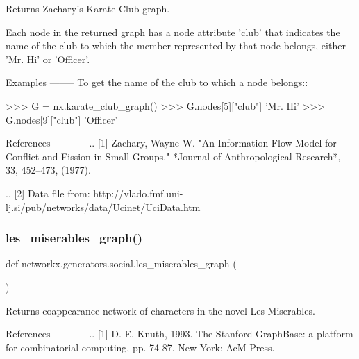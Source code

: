 \begin{DoxyVerb}Returns Zachary's Karate Club graph.

Each node in the returned graph has a node attribute 'club' that
indicates the name of the club to which the member represented by that node
belongs, either 'Mr. Hi' or 'Officer'.

Examples
--------
To get the name of the club to which a node belongs::

    >>> G = nx.karate_club_graph()
    >>> G.nodes[5]["club"]
    'Mr. Hi'
    >>> G.nodes[9]["club"]
    'Officer'

References
----------
.. [1] Zachary, Wayne W.
   "An Information Flow Model for Conflict and Fission in Small Groups."
   *Journal of Anthropological Research*, 33, 452--473, (1977).

.. [2] Data file from:
   http://vlado.fmf.uni-lj.si/pub/networks/data/Ucinet/UciData.htm
\end{DoxyVerb}
 \mbox{\label{namespacenetworkx_1_1generators_1_1social_a447c418a2427c4533b79b881c7453732}} 
\subsubsection{\texorpdfstring{les\+\_\+miserables\+\_\+graph()}{les\_miserables\_graph()}}
{\footnotesize\ttfamily def networkx.\+generators.\+social.\+les\+\_\+miserables\+\_\+graph (\begin{DoxyParamCaption}{ }\end{DoxyParamCaption})}

\begin{DoxyVerb}Returns coappearance network of characters in the novel Les Miserables.

References
----------
.. [1] D. E. Knuth, 1993.
   The Stanford GraphBase: a platform for combinatorial computing,
   pp. 74-87. New York: AcM Press.
\end{DoxyVerb}
 